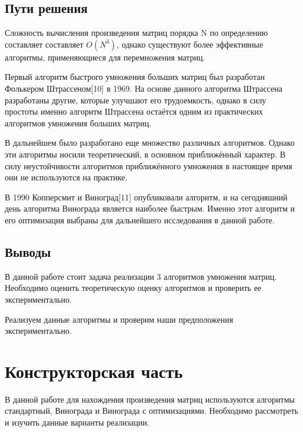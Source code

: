 \documentclass[a4paper,14pt]{article} %
\begin{document}
        	
        \subsection{Пути решения}
        \hfill
        
        Сложность вычисления произведения матриц порядка N по определению составляет составляет $O(N^3)$, однако существуют более эффективные алгоритмы, применяющиеся для перемножения матриц. 
        
        Первый алгоритм быстрого умножения больших матриц был разработан Фолькером Штрассеном[10] в 1969. На основе данного алгоритма Штрассена разработаны другие, которые улучшают его трудоемкость, однако в силу простоты  именно алгоритм Штрассена остаётся одним из практических алгоритмов умножения больших матриц. 
        
        В дальнейшем было разработано еще множество различных алгоритмов. Однако эти алгоритмы носили теоретический, в основном приближённый характер. В силу неустойчивости алгоритмов приближённого умножения в настоящее время они не используются на практике.

	В 1990 Копперсмит и Виноград[11] опубликовали алгоритм, и на сегодняшний день алгоритма Винограда является наиболее быстрым. Именно этот алгоритм и его оптимизация выбраны для дальнейшего исследования в данной работе. 	
	                
        \subsection{Выводы} 
        \hfill
        
        В данной работе стоит задача реализации 3 алгоритмов умножения матриц. Необходимо оценить теоретическую оценку алгоритмов и проверить ее экспериментально. 
        
        Реализуем данные алгоритмы и проверим наши предположения экспериментально. 
           

	\newpage

	\section{Конструкторская часть}
	\hfill
	
	 В данной работе для нахождения произведения матриц используются алгоритмы стандартный, Винограда и Винограда с оптимизациями. Необходимо рассмотреть и изучить данные варианты реализации. 
	
\end{document}
